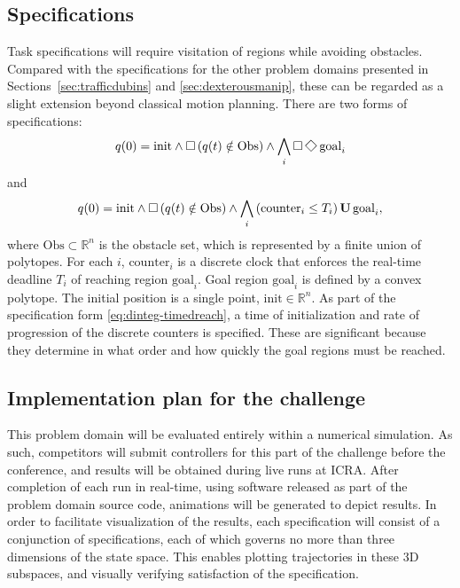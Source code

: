 \documentclass{amsart}
\theoremstyle{definition}
\begin{document}
\subsection{Specifications}

Task specifications will require visitation of regions while avoiding obstacles.
Compared with the specifications for the other problem domains presented in
Sections~\ref{sec:trafficdubins} and \ref{sec:dexterousmanip}, these can be
regarded as a slight extension beyond classical motion planning.  There are two
forms of specifications:
\begin{equation}\label{eq:dinteg-surveillance}
q(0) = \mathrm{init} \wedge \Galways \left( q(t) \notin \mathrm{Obs} \right) \wedge \bigwedge_{i} \Galways \Feventually \mathrm{goal}_i
\end{equation}
and
\begin{equation}\label{eq:dinteg-timedreach}
q(0) = \mathrm{init} \wedge \operatorname{\Box} \left( q(t) \notin \mathrm{Obs} \right) \wedge \bigwedge_{i} \left( \mathrm{counter}_i \leq T_{i} \right) \operatorname{\mathbf{U}} \mathrm{goal}_i ,
\end{equation}
where $\mathrm{Obs} \subset \mathbb{R}^n$ is the obstacle set, which is
represented by a finite union of polytopes.  For each $i$, $\mathrm{counter}_i$
is a discrete clock that enforces the real-time deadline $T_i$ of reaching
region $\mathrm{goal}_i$.  Goal region $\mathrm{goal}_i$ is defined by a convex
polytope.  The initial position is a single point, $\mathrm{init}\in
\mathbb{R}^n$.  As part of the specification form \eqref{eq:dinteg-timedreach},
a time of initialization and rate of progression of the discrete counters is
specified.  These are significant because they determine in what order and how
quickly the goal regions must be reached.



\subsection{Implementation plan for the challenge}

This problem domain will be evaluated entirely within a numerical simulation.
As such, competitors will submit controllers for this part of the challenge
before the conference, and results will be obtained during live runs at ICRA.
After completion of each run in real-time, using software released as part of
the problem domain source code, animations will be generated to depict results.
In order to facilitate visualization of the results, each specification will consist 
of a conjunction of specifications, each of which governs no more than three 
dimensions of the state space. This enables plotting trajectories in these 3D 
subspaces, and visually verifying satisfaction of the specification. 
\end{document}
